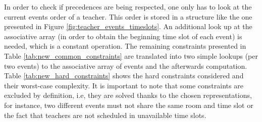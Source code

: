 In order to check if precedences are being respected, one only has to look at the current events order of a teacher. This order is stored in a structure like the one presented in Figure \ref{fig:teacher_events_timeslots}. An additional look up at the associative array (in order to obtain the beginning time slot of each event) is needed, which is a constant operation. The remaining constraints presented in Table \ref{tab:new_common_constraints} are translated into two simple lookups (per two events) to the associative array of events and the afterwards computation.\\


Table \ref{tab:new_hard_constraints} shows the hard constraints considered and their worst-case complexity. It is important to note that some constraints are excluded by definition, i.e, they are solved thanks to the chosen representations, for instance, two different events must not share the same
room and time slot or the fact that teachers are not scheduled in unavailable time slots. 
 


